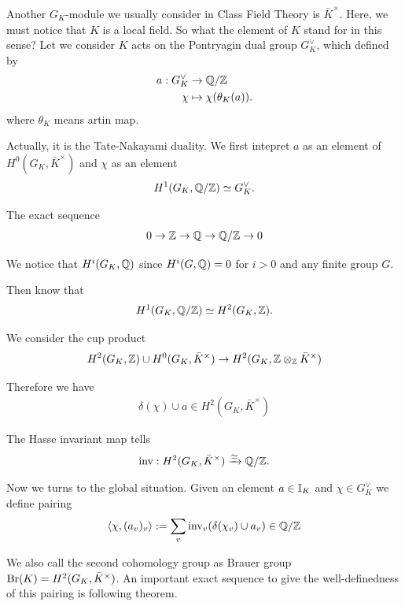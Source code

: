 {Another $G_K$-module we usually consider in Class Field Theory is $\bar{K}^\times$.
Here, we must notice that $K$ is a local field.
So what the element of $K$ stand for in this sense? 
Let we consider $K$ acts on the Pontryagin dual group $G_{K}^\vee$, which defined by 
\begin{align*}
    a: G_K^\vee &\to \mathbb{Q}/\mathbb{Z}\\
    \chi&\mapsto \chi(\theta_K(a)).
\end{align*}
where $\theta_K$ means artin map.

Actually, it is the Tate-Nakayami duality. We first intepret $a$ as an element of $H^0(G_K,\bar{K}^\times)$ and $\chi$ as an element 
\begin{align*}
    H^1(G_K,\mathbb{Q}/\mathbb{Z}) \simeq G_K^\vee. 
\end{align*}

The exact sequence 
\begin{align*}
    0\to \mathbb{Z} \to \mathbb{Q} \to \mathbb{Q}/\mathbb{Z} \to 0
\end{align*}

We notice that $H^i(G_K,\mathbb{Q})$ since $H^i(G,\mathbb{Q})=0$ for $i>0$ and any finite group $G$.

Then know that 
\begin{align*}
    H^1(G_K,\mathbb{Q}/\mathbb{Z}) \simeq H^2(G_K,\mathbb{Z}).
\end{align*}

We consider the cup product 
\begin{align*}
    H^2(G_K,\mathbb{Z}) \cup H^0(G_K,\bar{K}^\times) \to  H^2(G_K,\mathbb{Z}\otimes_{\mathbb{Z}} \bar{K}^\times)
\end{align*}

Therefore we have 
\begin{align*}
    \delta(\chi) \cup a \in H^2(G_K,\bar{K}^\times)
\end{align*}

The Hasse invariant map tells 
\begin{align*}
    \text{inv}:H^2(G_K,\bar{K}^\times) \xrightarrow{\simeq} \mathbb{Q}/\mathbb{Z}.
\end{align*}





Now we turns to the global situation. Given an element $a\in \mathbb{I}_K$ and $\chi \in G_K^\vee$ we define pairing 
\begin{align*}
    \langle \chi,(a_v)_v \rangle:= \sum_{v} \text{inv}_v(\delta(\chi_v)\cup a_v) \in \mathbb{Q}/\mathbb{Z}
\end{align*}

We also call the second cohomology group as Brauer group $\operatorname{Br}(K) = H^2(G_K,\bar{K}^\times)$. 
An important exact sequence to give the well-definedness of this pairing is following theorem.

}
